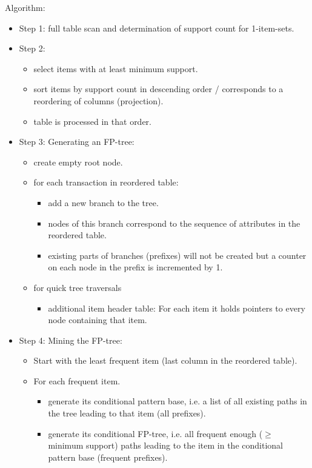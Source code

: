 \begin{breakbox}
\newline Algorithm:
\begin{itemize}
	\item Step 1: full table scan and determination of support count for 1-item-sets.
	\item Step 2:
		\begin{itemize}
			\item select items with at least minimum support.
			\item sort items by support count in descending order / corresponds to a reordering of columns (projection).
			\item table is processed in that order.
		\end{itemize}
	\item Step 3: Generating an FP-tree:
		\begin{itemize}
			\item create empty root node.
			\item for each transaction in reordered table:
				\begin{itemize}
					\item add a new branch to the tree.
					\item nodes of this branch correspond to the sequence of attributes in the reordered table.
					\item existing parts of branches (prefixes) will not be created but a counter on each node in the prefix is incremented by 1.
				\end{itemize}
			\item for quick tree traversals
				\begin{itemize}
					\item additional item header table: For each item it holds pointers to every node containing that item.
				\end{itemize}
		\end{itemize}
	\item Step 4: Mining the FP-tree:
		\begin{itemize}
			\item Start with the least frequent item (last column in the reordered table).
			\item For each frequent item.
				\begin{itemize}
					\item generate its conditional pattern base, i.e. a list of all existing paths in the tree leading to that item (all prefixes).
					\item generate its conditional FP-tree, i.e. all frequent enough ($\geq$ minimum support) paths leading to the item in the conditional pattern base (frequent prefixes).

\end{itemize}
\end{itemize}
\end{itemize}
\end{breakbox}
